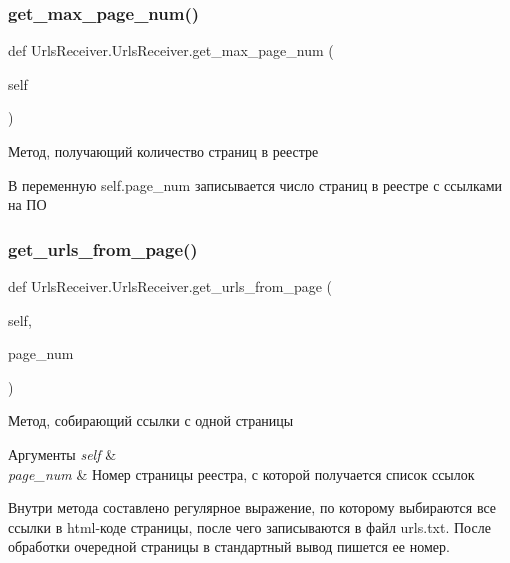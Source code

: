 \subsubsection{\texorpdfstring{get\+\_\+max\+\_\+page\+\_\+num()}{get\_max\_page\_num()}}
{\footnotesize\ttfamily def Urls\+Receiver.\+Urls\+Receiver.\+get\+\_\+max\+\_\+page\+\_\+num (\begin{DoxyParamCaption}\item[{}]{self }\end{DoxyParamCaption})}



Метод, получающий количество страниц в реестре 

В переменную {\ttfamily self.\+page\+\_\+num} записывается число страниц в реестре с ссылками на ПО \mbox{\label{classUrlsReceiver_1_1UrlsReceiver_ace2cdcb9a1bb117d80ec0efad2b2374b}} 
\subsubsection{\texorpdfstring{get\+\_\+urls\+\_\+from\+\_\+page()}{get\_urls\_from\_page()}}
{\footnotesize\ttfamily def Urls\+Receiver.\+Urls\+Receiver.\+get\+\_\+urls\+\_\+from\+\_\+page (\begin{DoxyParamCaption}\item[{}]{self,  }\item[{}]{page\+\_\+num }\end{DoxyParamCaption})}



Метод, собирающий ссылки с одной страницы 


\begin{DoxyParams}{Аргументы}
{\em self} & \\
\hline
{\em page\+\_\+num} & Номер страницы реестра, с которой получается список ссылок\\
\hline
\end{DoxyParams}
Внутри метода составлено регулярное выражение, по которому выбираются все ссылки в html-\/коде страницы, после чего записываются в файл {\ttfamily urls.\+txt}. После обработки очередной страницы в стандартный вывод пишется ее номер. \mbox{\label{classUrlsReceiver_1_1UrlsReceiver_a1dfd347420ffce5e3c510feb8a436d30}} 
